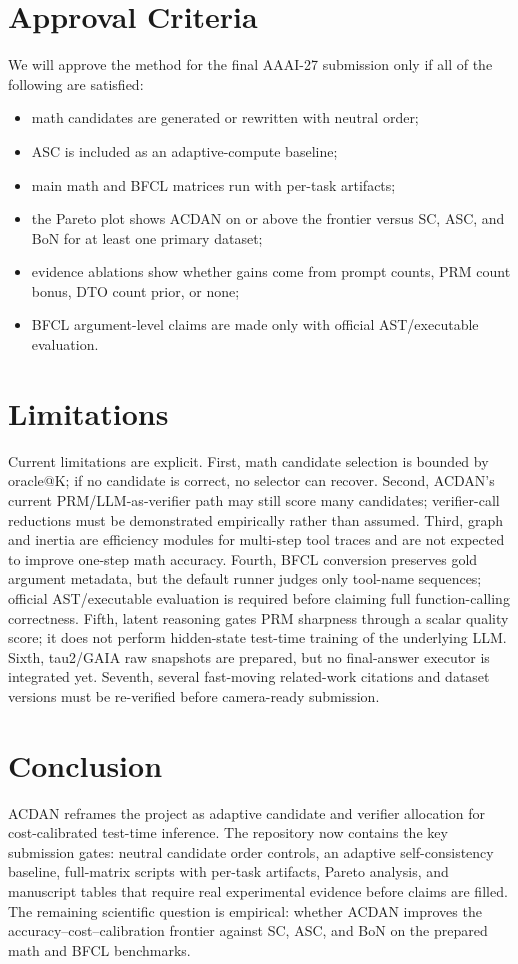 \documentclass[letterpaper]{article} %
\begin{document}
\section{Approval Criteria}
We will approve the method for the final AAAI-27 submission only if all of the
following are satisfied:
\begin{itemize}
\item math candidates are generated or rewritten with neutral order;
\item ASC is included as an adaptive-compute baseline;
\item main math and BFCL matrices run with per-task artifacts;
\item the Pareto plot shows ACDAN on or above the frontier versus SC, ASC, and
BoN for at least one primary dataset;
\item evidence ablations show whether gains come from prompt counts, PRM count
bonus, DTO count prior, or none;
\item BFCL argument-level claims are made only with official AST/executable
evaluation.
\end{itemize}

\section{Limitations}
Current limitations are explicit. First, math candidate selection is bounded by
oracle@K; if no candidate is correct, no selector can recover. Second, ACDAN's
current PRM/LLM-as-verifier path may still score many candidates; verifier-call
reductions must be demonstrated empirically rather than assumed. Third, graph and
inertia are efficiency modules for multi-step tool traces and are not expected to
improve one-step math accuracy. Fourth, BFCL conversion preserves gold argument
metadata, but the default runner judges only tool-name sequences; official
AST/executable evaluation is required before claiming full function-calling
correctness. Fifth, latent reasoning gates PRM sharpness through a scalar quality
score; it does not perform hidden-state test-time training of the underlying LLM.
Sixth, tau2/GAIA raw snapshots are prepared, but no final-answer
executor is integrated yet. Seventh, several fast-moving related-work citations
and dataset versions must be re-verified before camera-ready submission.

\section{Conclusion}
ACDAN reframes the project as adaptive candidate and verifier allocation for
cost-calibrated test-time inference. The repository now contains the key
submission gates: neutral candidate order controls, an adaptive
self-consistency baseline, full-matrix scripts with per-task artifacts, Pareto
analysis, and manuscript tables that require real experimental evidence before
claims are filled. The remaining scientific question is empirical: whether ACDAN
improves the accuracy--cost--calibration frontier against SC, ASC, and BoN on
the prepared math and BFCL benchmarks.
\end{document}
